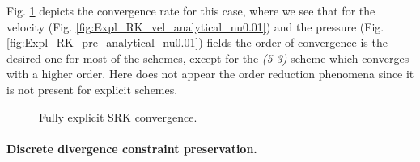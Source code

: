 Fig. \ref{fig:Expl_RK_analytical} depicts the convergence rate for this case, where we see that for the velocity (Fig. \ref{fig:Expl_RK_vel_analytical_nu0.01}) and the pressure (Fig. \ref{fig:Expl_RK_pre_analytical_nu0.01}) fields the order of convergence is the desired one for most of the schemes, except for the \textit{(5-3)} scheme which converges with a higher order. Here does not appear the order reduction phenomena since it is not present for explicit schemes.
\begin{figure}[h!]
  \centering
  \caption{Fully explicit SRK convergence.}
  \label{fig:Expl_RK_analytical}
\end{figure}


\paragraph{Discrete divergence constraint preservation.}

